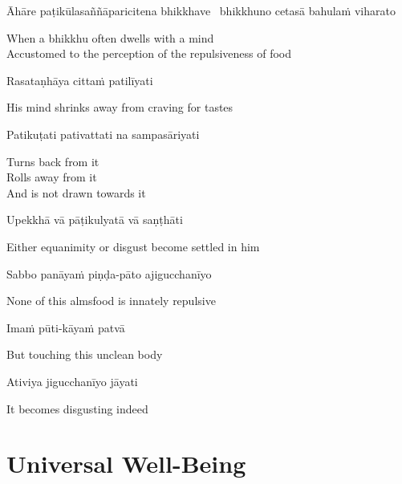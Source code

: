 \begin{pali-hang}
  Āhāre paṭikūlasaññāparicitena bhikkhave \breathmark\ bhikkhuno cetasā bahulaṁ viharato
\end{pali-hang}

\begin{english}
  When a bhikkhu often dwells with a mind\\
  Accustomed to the perception of the repulsiveness of food
\end{english}

Rasataṇhāya cittaṁ patilīyati

\begin{english}
  His mind shrinks away from craving for tastes
\end{english}

Patikuṭati pativattati na sampasāriyati

\begin{english-verses}
  Turns back from it\\
  Rolls away from it\\
  And is not drawn towards it
\end{english-verses}

Upekkhā vā pāṭikulyatā vā saṇṭhāti

\begin{english}
  Either equanimity or disgust become settled in him
\end{english}

\suttaRef{[AN 7.49]}

Sabbo panāyaṁ piṇḍa-pāto ajigucchanīyo

\begin{english}
  None of this almsfood is innately repulsive
\end{english}

Imaṁ pūti-kāyaṁ patvā

\begin{english}
  But touching this unclean body
\end{english}

Ativiya jigucchanīyo jāyati

\begin{english}
  It becomes disgusting indeed
\end{english}

\suttaRef{[Trad]}


\section{Universal Well-Being}
\label{universal-well-being}

